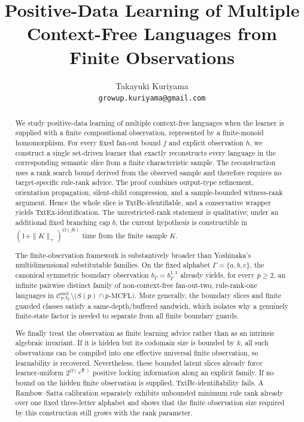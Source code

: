\documentclass[11pt,a4paper]{article}
\title{Positive-Data Learning of Multiple Context-Free Languages from Finite Observations}
\author{Takayuki Kuriyama\\\texttt{growup.kuriyama@gmail.com}}
\date{}
\numberwithin{equation}{section}
\theoremstyle{plain}
\theoremstyle{definition}
\theoremstyle{remark}
\newcommand{\Cmcf}[2]{\mathcal{C}^{\mathrm{mcf}}_{#1,#2}}
\begin{document}
\setlength{\abovedisplayskip}{6pt plus 2pt minus 3pt}
\setlength{\belowdisplayskip}{6pt plus 2pt minus 3pt}
\setlength{\abovedisplayshortskip}{3pt plus 1pt minus 2pt}
\setlength{\belowdisplayshortskip}{3pt plus 1pt minus 2pt}
\maketitle


\begin{abstract}
We study positive-data learning of multiple context-free languages when the
learner is supplied with a finite compositional observation, represented by a
finite-monoid homomorphism.  For every fixed fan-out bound $f$ and explicit
observation $h$, we construct a single set-driven learner that exactly
reconstructs every language in the corresponding semantic slice from a finite
characteristic sample.  The reconstruction uses a rank search bound derived
from the observed sample and therefore requires no target-specific rule-rank
advice.  The proof combines output-type refinement, orientation propagation,
silent-child compression, and a sample-bounded witness-rank argument.  Hence
the whole slice is TxtBc-identifiable, and a conservative wrapper yields
TxtEx-identification.  The unrestricted-rank statement is qualitative; under
an additional fixed branching cap $b$, the current hypothesis is constructible
in $(1+\|K\|_+)^{O(fb)}$ time from the finite sample $K$.

The finite-observation framework is substantively broader than Yoshinaka's
multidimensional substitutable families.  On the fixed alphabet
$\Gamma=\{a,b,c\}$, the canonical symmetric boundary observation
$b_\Gamma=b_\Gamma^{1,1}$ already yields, for every $p\ge2$, an infinite
pairwise distinct family of non-context-free fan-out-two, rule-rank-one
languages in $\Cmcf{p}{b_\Gamma}\setminus\bigl(S(p)\cap p\text{-}\mathrm{MCFL}\bigr)$.  More generally, the boundary slices and finite guarded
classes satisfy a same-depth/buffered sandwich, which isolates why a genuinely
finite-state factor is needed to separate from all finite boundary guards.

We finally treat the observation as finite learning advice rather than as an
intrinsic algebraic invariant.  If it is hidden but its codomain size is
bounded by $k$, all such observations can be compiled into one effective
universal finite observation, so learnability is recovered.  Nevertheless,
these bounded latent slices already force learner-uniform
$2^{\Omega(\sqrt{k})}$ positive locking information along an explicit family.
If no bound on the hidden finite observation is supplied, TxtBc-identifiability
fails.  A Rambow--Satta calibration separately exhibits unbounded minimum rule
rank already over one fixed three-letter alphabet and shows that the finite
observation size required by this construction still grows with the rank
parameter.
\end{abstract}
\end{document}
